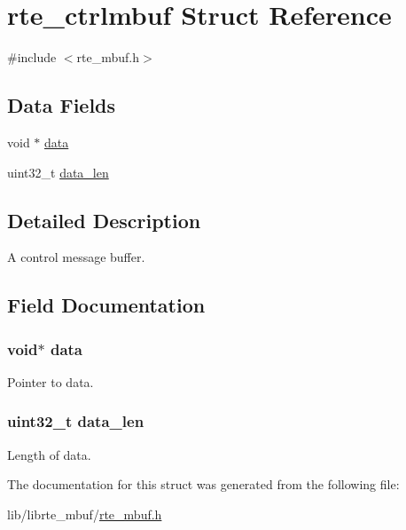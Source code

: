 \hypertarget{structrte__ctrlmbuf}{}\section{rte\+\_\+ctrlmbuf Struct Reference}
\label{structrte__ctrlmbuf}


{\ttfamily \#include $<$rte\+\_\+mbuf.\+h$>$}

\subsection*{Data Fields}
\begin{DoxyCompactItemize}
\item 
void $\ast$ \hyperlink{structrte__ctrlmbuf_a735984d41155bc1032e09bece8f8d66d}{data}
\item 
uint32\+\_\+t \hyperlink{structrte__ctrlmbuf_a231d88a2076c53df88d8ffd7eb1c50ec}{data\+\_\+len}
\end{DoxyCompactItemize}


\subsection{Detailed Description}
A control message buffer. 

\subsection{Field Documentation}
\hypertarget{structrte__ctrlmbuf_a735984d41155bc1032e09bece8f8d66d}{}
\subsubsection[{data}]{\setlength{\rightskip}{0pt plus 5cm}void$\ast$ data}\label{structrte__ctrlmbuf_a735984d41155bc1032e09bece8f8d66d}
Pointer to data. \hypertarget{structrte__ctrlmbuf_a231d88a2076c53df88d8ffd7eb1c50ec}{}
\subsubsection[{data\+\_\+len}]{\setlength{\rightskip}{0pt plus 5cm}uint32\+\_\+t data\+\_\+len}\label{structrte__ctrlmbuf_a231d88a2076c53df88d8ffd7eb1c50ec}
Length of data. 

The documentation for this struct was generated from the following file\+:\begin{DoxyCompactItemize}
\item 
lib/librte\+\_\+mbuf/\hyperlink{rte__mbuf_8h}{rte\+\_\+mbuf.\+h}\end{DoxyCompactItemize}
